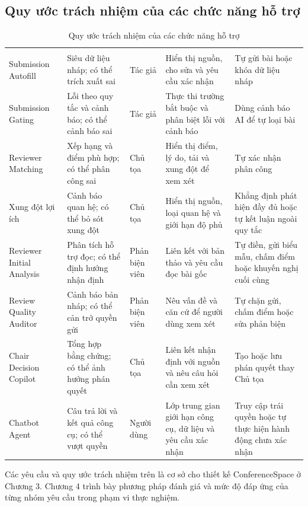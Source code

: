 \subsection{Quy ước trách nhiệm của các chức năng hỗ trợ}

\begingroup
\setlength{\tabcolsep}{2pt}
\setlength{\LTleft}{0pt plus \textwidth}
\setlength{\LTright}{0pt plus \textwidth}
\begin{longtable}{|P{0.14\textwidth}|P{0.20\textwidth}|P{0.14\textwidth}|P{0.25\textwidth}|P{0.20\textwidth}|}
  \caption{Quy ước trách nhiệm của các chức năng hỗ trợ}\\
\hline
{} &  &  &  &  \\ \hline
\endfirsthead
\hline
{} &  &  &  &  \\ \hline
\endhead
\hline
\endfoot
Submission Autofill & Siêu dữ liệu nháp; có thể trích xuất sai & Tác giả & Hiển thị nguồn, cho sửa và yêu cầu xác nhận & Tự gửi bài hoặc khóa dữ liệu nháp \\ \hline
Submission Gating & Lỗi theo quy tắc và cảnh báo; có thể cảnh báo sai & Tác giả & Thực thi trường bắt buộc và phân biệt lỗi với cảnh báo & Dùng cảnh báo AI để tự loại bài \\ \hline
Reviewer Matching & Xếp hạng và điểm phù hợp; có thể phân công sai & Chủ tọa & Hiển thị điểm, lý do, tải và xung đột để xem xét & Tự xác nhận phân công \\ \hline
Xung đột lợi ích & Cảnh báo quan hệ; có thể bỏ sót xung đột & Chủ tọa & Hiển thị nguồn, loại quan hệ và giới hạn độ phủ & Khẳng định phát hiện đầy đủ hoặc tự kết luận ngoài quy tắc \\ \hline
Reviewer Initial Analysis & Phân tích hỗ trợ đọc; có thể định hướng nhận định & Phản biện viên & Liên kết với bản thảo và yêu cầu đọc bài gốc & Tự điền, gửi biểu mẫu, chấm điểm hoặc khuyến nghị cuối cùng \\ \hline
Review Quality Auditor & Cảnh báo bản nháp; có thể cản trở quyền gửi & Phản biện viên & Nêu vấn đề và căn cứ để người dùng xem xét & Tự chặn gửi, chấm điểm hoặc sửa phản biện \\ \hline
Chair Decision Copilot & Tổng hợp bằng chứng; có thể ảnh hưởng phán quyết & Chủ tọa & Liên kết nhận định với nguồn và nêu câu hỏi cần xem xét & Tạo hoặc lưu phán quyết thay Chủ tọa \\ \hline
Chatbot Agent & Câu trả lời và kết quả công cụ; có thể vượt quyền & Người dùng & Lớp trung gian giới hạn công cụ, dữ liệu và yêu cầu xác nhận & Truy cập trái quyền hoặc tự thực hiện hành động chưa xác nhận \\ \hline
\end{longtable}
\endgroup

Các yêu cầu và quy ước trách nhiệm trên là cơ sở cho thiết kế ConferenceSpace ở Chương 3. Chương 4 trình bày phương pháp đánh giá và mức độ đáp ứng của từng nhóm yêu cầu trong phạm vi thực nghiệm.
